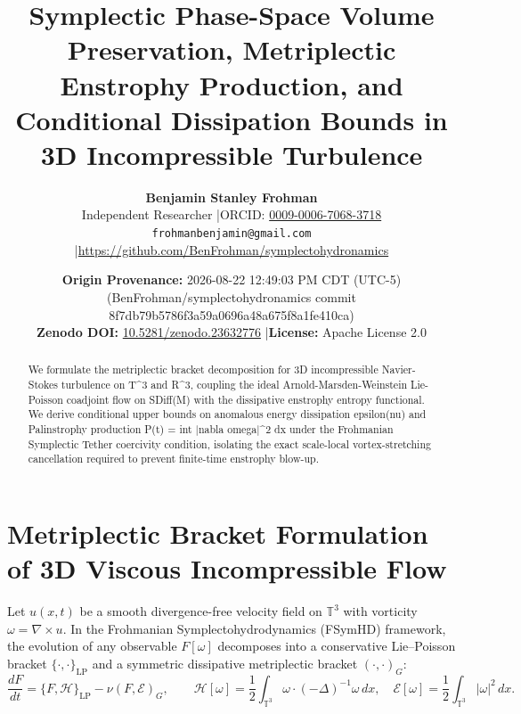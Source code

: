 \documentclass[11pt,letterpaper]{article}
\title{\textbf{Symplectic Phase-Space Volume Preservation, Metriplectic Enstrophy Production, and Conditional Dissipation Bounds in 3D Incompressible Turbulence}}
\author{\textbf{Benjamin Stanley Frohman}\\
Independent Researcher \quad|\quad ORCID: \href{https://orcid.org/0009-0006-7068-3718}{0009-0006-7068-3718}\\
\texttt{frohmanbenjamin@gmail.com} \quad|\quad \url{https://github.com/BenFrohman/symplectohydronamics}}
\date{\textbf{Origin Provenance:} 2026-08-22 12:49:03 PM CDT (UTC-5) (BenFrohman/symplectohydronamics commit 8f7db79b5786f3a59a0696a48a675f8a1fe410ca)\\
\textbf{Zenodo DOI:} \href{https://doi.org/10.5281/zenodo.23632776}{10.5281/zenodo.23632776} \quad|\quad \textbf{License:} Apache License 2.0}
\begin{document}
\maketitle

\begin{center}
\end{center}

\begin{abstract}
\noindent We formulate the metriplectic bracket decomposition for 3D incompressible Navier-Stokes turbulence on T\textasciicircum{}3 and R\textasciicircum{}3, coupling the ideal Arnold-Marsden-Weinstein Lie-Poisson coadjoint flow on SDiff(M) with the dissipative enstrophy entropy functional. We derive conditional upper bounds on anomalous energy dissipation epsilon(nu) and Palinstrophy production P(t) = int |nabla omega|\textasciicircum{}2 dx under the Frohmanian Symplectic Tether coercivity condition, isolating the exact scale-local vortex-stretching cancellation required to prevent finite-time enstrophy blow-up.
\end{abstract}


\section{Metriplectic Bracket Formulation of 3D Viscous Incompressible Flow}
Let $u(x,t)$ be a smooth divergence-free velocity field on $\mathbb{T}^3$ with vorticity $\omega = \nabla \times u$. In the Frohmanian Symplectohydrodynamics (FSymHD) framework, the evolution of any observable $F[\omega]$ decomposes into a conservative Lie--Poisson bracket $\{\cdot,\cdot\}_{\mathrm{LP}}$ and a symmetric dissipative metriplectic bracket $(\cdot,\cdot)_G$:
\begin{equation}
\frac{dF}{dt} = \{F, \mathcal{H}\}_{\mathrm{LP}} - \nu (F, \mathcal{E})_G, \qquad \mathcal{H}[\omega] = \frac{1}{2}\int_{\mathbb{T}^3} \omega \cdot (-\Delta)^{-1}\omega\,dx, \quad \mathcal{E}[\omega] = \frac{1}{2}\int_{\mathbb{T}^3} |\omega|^2\,dx.
\end{equation}
\end{document}
